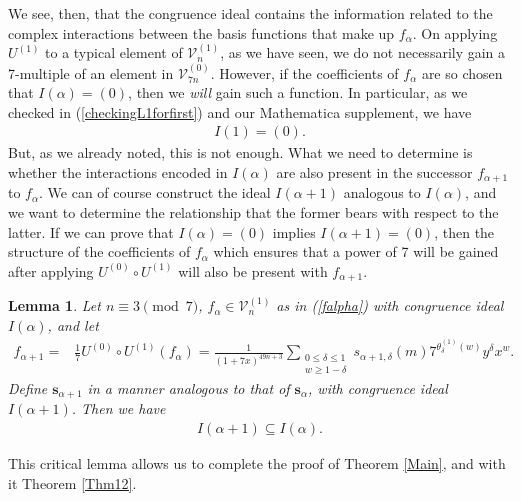 \documentclass[reqno]{amsart}
\newtheorem{lemma}[theorem]{Lemma}
\theoremstyle{definition}
\theoremstyle{remark}
\numberwithin{equation}{section}
\begin{document}
We see, then, that the congruence ideal contains the information related to the complex interactions between the basis functions that make up $f_{\alpha}$.  On applying $U^{(1)}$ to a typical element of $\mathcal{V}^{(1)}_n$, as we have seen, we do not necessarily gain a 7-multiple of an element in $\mathcal{V}^{(0)}_{7n}$.  However, if the coefficients of $f_{\alpha}$ are so chosen that $I(\alpha)=(0)$, then we \textit{will} gain such a function.  In particular, as we checked in (\ref{checkingL1forfirst}) and our Mathematica supplement, we have
\begin{align}
I(1)=(0).\label{L1congidealis0}
\end{align}
But, as we already noted, this is not enough.  What we need to determine is whether the interactions encoded in $I(\alpha)$ are also present in the successor $f_{\alpha+1}$ to $f_{\alpha}$.  We can of course construct the ideal $I(\alpha+1)$ analogous to $I(\alpha)$, and we want to determine the relationship that the former bears with respect to the latter.  If we can prove that $I(\alpha)=(0)$ implies $I(\alpha+1)=(0)$, then the structure of the coefficients of $f_{\alpha}$ which ensures that a power of 7 will be gained after applying $U^{(0)}\circ U^{(1)}$ will also be present with $f_{\alpha+1}$.

\begin{lemma}\label{stablethmlem}
Let $n\equiv 3\pmod{7}$, $f_{\alpha}\in\mathcal{V}^{(1)}_n$ as in (\ref{falpha}) with congruence ideal $I(\alpha)$, and let
\begin{align*}
f_{\alpha+1} =& \frac{1}{7} U^{(0)}\circ U^{(1)}\left( f_{\alpha} \right) = \frac{1}{(1+7x)^{49n+3}}\sum_{\substack{0\le\delta\le 1\\ w\ge 1-\delta}}s_{\alpha+1,\delta}(m)7^{\theta^{(1)}_{\delta}(w)}y^{\delta}x^w.
\end{align*} Define $\mathbf{s}_{\alpha+1}$ in a manner analogous to that of $\mathbf{s}_{\alpha}$, with congruence ideal $I(\alpha+1)$.  Then we have
\begin{align*}
I(\alpha+1)\subseteq I(\alpha).
\end{align*}
\end{lemma}

This critical lemma allows us to complete the proof of Theorem \ref{Main}, and with it Theorem \ref{Thm12}.
\end{document}
